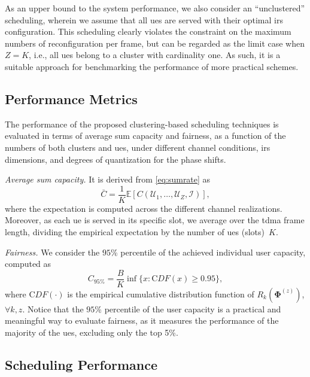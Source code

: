 As an upper bound to the system performance, we also consider an ``unclustered'' scheduling, wherein we assume that all \glspl{ue} are served with their optimal \gls{irs} configuration. This scheduling clearly violates the constraint on the maximum numbers of reconfiguration per frame, but can be regarded as the limit case when $Z = K$, i.e., all \glspl{ue} belong to a cluster with cardinality one. As such, it is a suitable approach for benchmarking the performance of more practical schemes.

\subsection{Performance Metrics}
\label{sec:metrics}

The performance of the proposed clustering-based scheduling techniques is evaluated in terms of average sum capacity and fairness, as a function of the numbers of both clusters and \glspl{ue}, under different channel conditions, \gls{irs} dimensions, and degrees of quantization for the phase shifts.

\emph{Average sum capacity.} 
It is derived from \eqref{eq:sumrate} as
\begin{equation}
    \bar{C} = \frac{1}{K}\mathbb{E}\left[C(\mathcal{U}_1,\ldots,\mathcal{U}_{Z},\mathcal{I})\right],
\end{equation}
where the expectation is computed across the different channel realizations. Moreover, as each \gls{ue} is served in its specific slot, we average over the \gls{tdma} frame length, dividing the empirical expectation by the number of \glspl{ue} (slots)~$K$.

\emph{Fairness.}
We consider the $95$\% percentile of the achieved individual user capacity, computed as
\begin{equation}\label{C95}
    C_{95\%} = \frac{B}{K}\inf\{x: {\mathrm CDF}(x) \geq 0.95\},
\end{equation}
where ${\mathrm CDF}(\cdot)$ is the empirical cumulative distribution function of $R_k(\bm{\Phi}^{(z)})$, $\forall k, z$.
Notice that the $95$\% percentile of the user capacity is a practical and meaningful way to evaluate fairness, as it measures the performance of the majority of the \glspl{ue}, excluding only the top 5\%.

\subsection{Scheduling Performance}
\label{sub:results}

